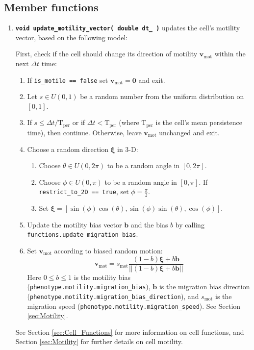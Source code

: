 \documentclass[12pt]{article}
\renewcommand{\vec}[1]{\mathbf{#1}}
\newcommand{\norm}[1]{\left|\left|{#1}\right|\right|}
\newcommand{\beq}{\begin{equation}}
\newcommand{\eeq}{\end{equation}}
\newcommand{\grvec}[1]{\boldsymbol{#1}}
\renewcommand{\v}{\verb}
\newcommand{\smallcode}[1]{\textbf{\texttt{#1}}}
\begin{document}
\subsection{Member functions}
\label{sec:cell_member_functions}
\begin{enumerate}
\item 
\smallcode{void update\_motility\_vector( double dt\_ )} updates 
the cell's motility vector, based on the following model: 

First, check if the cell should change its direction of 
motility $\vec{v}_\mathrm{mot}$ within the next $\Delta t$ time: 
\begin{enumerate}
\item 
If \v|is_motile == false| set $\vec{v}_\mathrm{mot} = \vec{0}$ and exit. 
\item 
Let 
$s \in U(0,1)$ be a random number from the uniform 
distribution on $[0,1]$. 
\item 
If $s \le \Delta t / \mathrm{T}_\mathrm{per}$ or if 
$\Delta t < \mathrm{T}_\mathrm{per}$ (where $\mathrm{T}_\mathrm{per}$ 
is the cell's mean persistence time), then continue. Otherwise, 
leave $\vec{v}_\mathrm{mot}$ unchanged and exit. 
\item 
Choose a random direction $\grvec{\xi}$ in 3-D: 
\begin{enumerate}
\item 
Choose $\theta \in U(0,2\pi)$ to be a random angle in $[0, 2\pi]$. 
\item 
Choose $\phi \in U(0,\pi)$ to be a random angle in $[0, \pi]$. If 
\v|restrict_to_2D == true|, set $\phi = \frac{\pi}{2}$.   
\item 
Set $\grvec{\xi} = \left[ \sin(\phi)\cos(\theta) , \sin(\phi)\sin(\theta) , \cos(\phi) \right]$. 
\end{enumerate}
\item 
Update the motility bias vector $\vec{b}$ and the bias $b$ 
by calling \hfill\break 
\v|functions.update_migration_bias|. 

\item 
Set $\vec{v}_\mathrm{mot}$ according to biased random motion: 
\beq
\vec{v}_\mathrm{mot} 
= 
s_\mathrm{mot} 
\frac{ 
( 1 - b) \grvec{\xi} + b \vec{b} 
} 
{ 
\norm{ ( 1 - b) \grvec{\xi} + b \vec{b}  }
}
\eeq
Here $0 \le b \le 1$ is the motility bias 
(\v|phenotype.motility.migration_bias|), 
$\vec{b}$ is the migration bias direction 
(\v|phenotype.motility.migration_bias_direction|), and 
$s_\mathrm{mot}$ is the migration speed 
(\v|phenotype.motility.migration_speed|). 
See Section \ref{sec:Motility}. 
\end{enumerate}
See Section \ref{sec:Cell_Functions} for more 
information on cell functions, and 
Section \ref{sec:Motility} for further details on 
cell motility. 



\end{enumerate}
\end{document}

